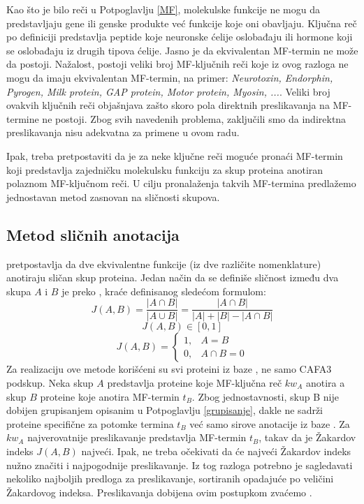 Kao što je bilo reči u Potpoglavlju \ref{MF}, molekulske funkcije ne mogu da
predstavljaju gene ili genske produkte već funkcije koje oni obavljaju. Ključna
reč  po definiciji predstavlja peptide koje neuronske
ćelije oslobađaju ili hormone koji se oslobađaju iz drugih tipova ćelije. Jasno
je da ekvivalentan MF-termin ne može da postoji.  Nažalost, postoji veliki broj
MF-ključnih reči koje iz ovog razloga ne mogu da imaju ekvivalentan MF-termin,
na primer: \textit{ Neurotoxin, Endorphin, Pyrogen, Milk protein, GAP protein,
Motor protein, Myosin, ...}. Veliki broj ovakvih ključnih reči objašnjava 
zašto skoro pola direktnih preslikavanja na MF-termine ne postoji.  Zbog svih
navedenih problema, zaključili smo da indirektna preslikavanja nisu adekvatna za
primene u ovom radu.

Ipak, treba pretpostaviti da je za neke ključne reči moguće pronaći MF-termin
koji predstavlja zajedničku molekulsku funkciju za skup proteina anotiran
polaznom MF-ključnom reči.  U cilju pronalaženja takvih MF-termina predlažemo
jednostavan metod zasnovan na sličnosti skupova.

\subsection{Metod sličnih anotacija}

 pretpostavlja da dve ekvivalentne funkcije (iz dve
različite nomenklature) anotiraju sličan skup proteina.  Jedan način da se
definiše sličnost između dva skupa $A$ i $B$ je preko 
, kraće   definisanog sledećom formulom:
$$J(A,B) = \dfrac{|A \cap B|}{|A \cup B|} =  \dfrac{|A \cap B|}{|A|+|B|-|A \cap B|}$$
$$  J(A,B) \in [0, 1] $$
\[   
  J(A,B) = 
    \begin{cases}
      1,&A=B  \\
      0,&A\cap B=0
    \end{cases}
\]
Za realizaciju ove metode korišćeni su svi proteini iz baze \swissprot, ne samo
CAFA3 podskup.  Neka skup $A$ predstavlja proteine koje MF-ključna reč $kw_A$
anotira a skup $B$ proteine koje anotira MF-termin $t_B$.  Zbog jednostavnosti,
skup B nije dobijen grupisanjem opisanim u Potpoglavlju \ref{grupisanje}, dakle ne sadrži proteine specifične za potomke termina $t_B$ već samo
sirove anotacije iz baze \swissprot.  Za $kw_A$ najverovatnije
preslikavanje predstavlja MF-termin $t_B$, takav da je Žakardov indeks $J(A,B)$
najveći. Ipak, ne treba očekivati da će najveći Žakardov indeks nužno značiti i
najpogodnije preslikavanje. Iz tog razloga potrebno je  sagledavati nekoliko
najboljih predloga za preslikavanje, sortiranih opadajuće po veličini Žakardovog
indeksa. Preslikavanja dobijena ovim postupkom zvaćemo .

